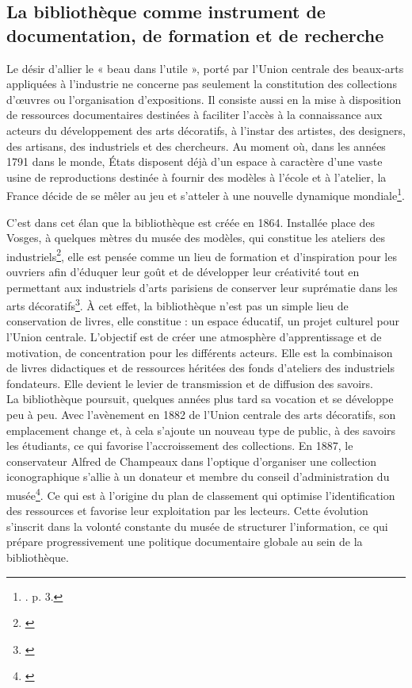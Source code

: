 \subsection*{La bibliothèque comme instrument de documentation, de formation et de recherche}

Le désir d’allier le « beau dans l’utile », porté par l’Union centrale des beaux-arts appliquées à l’industrie ne concerne pas seulement la constitution des collections d’œuvres ou l’organisation d’expositions. Il consiste aussi en la mise à disposition de ressources documentaires destinées à faciliter l’accès à la connaissance aux acteurs du développement des arts décoratifs, à l’instar des artistes, des designers, des artisans, des industriels et des chercheurs. Au moment où, dans les années 1791 dans le monde, États disposent déjà d’un espace à caractère d’une vaste usine de reproductions destinée à fournir des modèles à l’école et à l’atelier, la France décide de se mêler au jeu et s’atteler à une nouvelle dynamique mondiale\footnote{\cite{A3-4-1887}. p. 3.}.

C’est dans cet élan que la bibliothèque est créée en 1864. Installée place des Vosges, à  quelques mètres du musée des modèles, qui constitue les ateliers des industriels\footnote{\cite{mad-histoire-bibliotheque}}, elle est pensée comme un  lieu de formation et d’inspiration  pour les ouvriers afin d’éduquer leur goût et de développer leur créativité tout en permettant aux industriels d’arts parisiens de conserver leur suprématie dans les arts décoratifs\footnote{\cite{mad-histoire-bibliotheque}}. À cet effet, la bibliothèque n’est pas un simple lieu de conservation de livres, elle constitue : un espace éducatif, un projet culturel pour l’Union centrale. L’objectif est de créer une atmosphère d’apprentissage et de motivation, de concentration pour les différents acteurs. Elle est la combinaison de livres didactiques et de ressources héritées des fonds d’ateliers des industriels fondateurs.  Elle devient le levier de transmission et de diffusion des savoirs.\\[0.2cm]

La bibliothèque poursuit, quelques années plus tard sa vocation et se développe peu à peu. Avec l’avènement en 1882 de l’Union centrale des arts décoratifs, son emplacement change et, à cela s’ajoute un nouveau type de public, à des savoirs les étudiants, ce qui favorise l’accroissement des collections. En 1887, le conservateur Alfred de Champeaux dans l’optique d’organiser une collection iconographique s’allie à un donateur et membre du conseil d’administration du musée\footnote{\cite{mad-histoire-bibliotheque}}. Ce qui est à l’origine du plan de classement  qui optimise l’identification des ressources et favorise leur exploitation par les lecteurs. Cette évolution s’inscrit dans la volonté constante du musée de structurer l’information, ce qui prépare progressivement une politique documentaire globale au sein de la bibliothèque.

